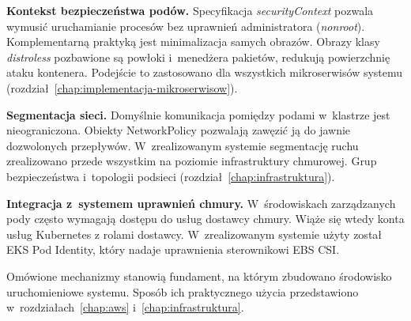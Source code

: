 \textbf{Kontekst bezpieczeństwa podów.} Specyfikacja \emph{securityContext} pozwala wymusić uruchamianie procesów
bez uprawnień administratora (\emph{nonroot}). Komplementarną praktyką jest minimalizacja samych obrazów. 
Obrazy klasy \emph{distroless} pozbawione są powłoki i~menedżera pakietów, redukują powierzchnię ataku kontenera.
Podejście to zastosowano dla wszystkich mikroserwisów systemu (rozdział~\ref{chap:implementacja-mikroserwisow}).

\textbf{Segmentacja sieci.} Domyślnie komunikacja pomiędzy podami w~klastrze jest nieograniczona. Obiekty
NetworkPolicy pozwalają zawęzić ją do jawnie dozwolonych przepływów. W~zrealizowanym systemie segmentację ruchu
zrealizowano przede wszystkim na poziomie infrastruktury chmurowej. Grup bezpieczeństwa i~topologii podsieci
(rozdział~\ref{chap:infrastruktura}).

\textbf{Integracja z~systemem uprawnień chmury.} W~środowiskach zarządzanych pody często wymagają dostępu do usług
dostawcy chmury. Wiąże się wtedy konta usług Kubernetes z rolami dostawcy. W~zrealizowanym systemie użyty został
EKS Pod Identity, który nadaje uprawnienia sterownikowi EBS CSI.

Omówione mechanizmy stanowią fundament, na którym zbudowano środowisko uruchomieniowe systemu. Sposób ich
praktycznego użycia  przedstawiono w~rozdziałach~\ref{chap:aws} i~\ref{chap:infrastruktura}.